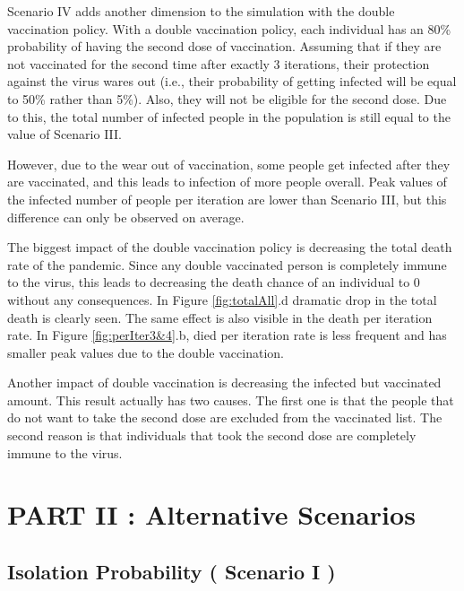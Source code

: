 \documentclass{article}
\begin{document}
Scenario IV adds another dimension to the simulation with the double vaccination policy. With a double vaccination policy, each individual has an 80\% probability of having the second dose of vaccination. Assuming that if they are not vaccinated for the second time after exactly 3 iterations, their protection against the virus wares out (i.e., their probability of getting infected will be equal to 50\% rather than 5\%). Also, they will not be eligible for the second dose. Due to this, the total number of infected people in the population is still equal to the value of Scenario III. 

However, due to the wear out of vaccination, some people get infected after they are vaccinated, and this leads to infection of more people overall. Peak values of the infected number of people per iteration are lower than Scenario III, but this difference can only be observed on average.

The biggest impact of the double vaccination policy is decreasing the total death rate of the pandemic. Since any double vaccinated person is completely immune to the virus, this leads to decreasing the death chance of an individual to 0 without any consequences. In Figure \ref{fig:totalAll}.d dramatic drop in the total death is clearly seen. The same effect is also visible in the death per iteration rate. In Figure \ref{fig:perIter3&4}.b, died per iteration rate is less frequent and has smaller peak values due to the double vaccination.

Another impact of double vaccination is decreasing the infected but vaccinated amount. This result actually has two causes. The first one is that the people that do not want to take the second dose are excluded from the vaccinated list. The second reason is that individuals that took the second dose are completely immune to the virus.
\newpage
{}
\section*{PART II : Alternative Scenarios}

\subsection*{Isolation Probability ( Scenario I )}
\end{document}

